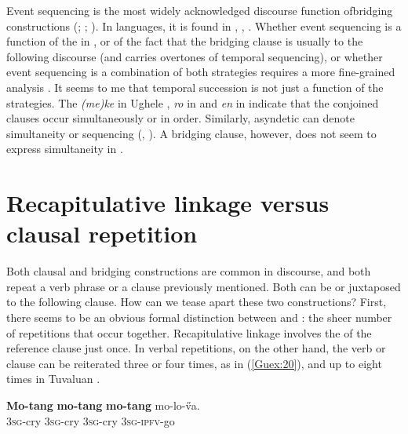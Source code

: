 \documentclass[output=paper]{LSP/langsci}
\begin{document}
Event sequencing is the most widely acknowledged discourse function of\linebreak bridging constructions (\citealt[][130, 242, 261]{hasan76};  \citealt[][370]{devries.2005}; \citealt[][273]{Thompson.et.al.2007}). In  languages, it is found in  \citep[][259]{dimock09},  \citep[427]{hyslop01},  \citep[24--26]{Schneider09}. Whether event sequencing is a function of the  in , or of the fact that the bridging clause is usually  to the following discourse (and  carries overtones of temporal sequencing), or whether event sequencing is a combination of both strategies requires a more fine-grained analysis \citep[see also][325]{guerin11}. It seems to me that temporal succession is not just a function of the  strategies. The  \textit{(me)ke} in Ughele \citep[][242]{Frostad2012}, \textit{ro} in  \citep[][322]{guerin11} and \textit{en} in  \citep[][230--231]{dimock09} indicate that the conjoined clauses occur simultaneously or in  order. Similarly, asyndetic  can denote simultaneity or sequencing (\citealt[][241]{Frostad2012}, \citealt[][425--426]{hyslop01}). A bridging clause, however, does not seem to express simultaneity in . 


\section{Recapitulative linkage versus clausal repetition}
\label{Gurepetition}
Both clausal  and bridging constructions are common in  discourse, and both repeat a verb phrase or a clause previously mentioned. Both can be  or juxtaposed to the following clause. How can we tease apart these two constructions?  First, there seems to be an obvious formal distinction between  and : the sheer number of repetitions that occur together. Recapitulative linkage involves the  of the reference clause just once. In verbal repetitions, on the other hand, the verb or clause can be reiterated three or four times, as in (\ref{Guex:20}), and up to eight times in Tuvaluan \citep[][487]{besnier00}.


\begin{exe}
\ex \label{Guex:20}
\gll    \textbf{Mo-tang}     \textbf{mo-tang}   \textbf{mo-tang} mo-lo-\H{v}a.\\     	       
 \textsc{3sg}-cry    \textsc{3sg}-cry  \textsc{3sg}-cry  \textsc{3sg-ipfv}-go\\
\glt {} \citep[][266]{guerin11}
\end{exe}
\end{document}
